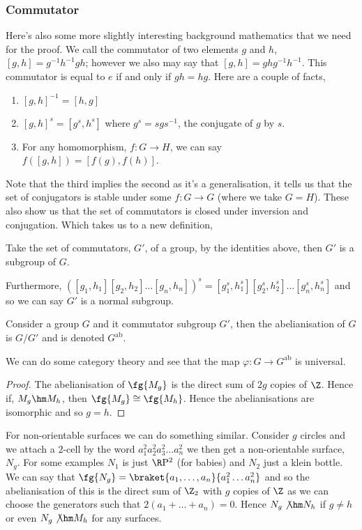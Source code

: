 \subsubsection{Commutator}
Here's also some more slightly interesting background mathematics that we need for the proof. We call the commutator of two elements $g$ and $h$, $[g, h] = g^{-1}h^{-1}gh$; however we also may say that $[g, h] = ghg^{-1}h^{-1}$. This commutator is equal to $e$ if and only if $gh = hg$. Here are a couple of facts,
\begin{enumerate}
  \item $[g, h]^{-1} = [h, g]$
  \item $[g, h]^s = [g^s, h^s]$ where $g^s = sgs^{-1}$, the conjugate of $g$ by $s$.
  \item For any homomorphism, $f : G \to H$, we can say $f([g, h]) = [f(g), f(h)]$.
\end{enumerate}
Note that the third implies the second as it's a generalisation, it tells us that the set of conjugators is stable under some $f : G \to G$ (where we take $G = H$). These also show us that the set of commutators is closed under inversion and conjugation. Which takes us to a new definition,
\begin{ndefi}
  Take the set of commutators, $G'$, of a group, by the identities above, then $G'$ is a subgroup of $G$.
\end{ndefi}

\noindent
Furthermore, $([g_1, h_1][g_2, h_2]\dots [g_n, h_n])^s = [g_1^s, h_1^s][g_2^s, h_2^s] \dots [g_n^s, h_n^s]$ and so we can say $G'$ is a normal subgroup.

\begin{ndefi}[Abelianisation]
  Consider a group $G$ and it commutator subgroup $G'$, then the abelianisation of $G$ is $G / G'$ and is denoted $G^{\text{ab}}$.
\end{ndefi}

\noindent
We can do some category theory and see that the map $\varphi : G \to G^{\text{ab}}$ is universal.

\begin{proof}
  The abelianisation of $\fg {M_g}$ is the direct sum of $2g$ copies of $\Z$. Hence if, $M_g \hm M_h$, then $\fg {M_g} \cong \fg {M_h}$. Hence the abelianisations are isomorphic and so $g = h$.
\end{proof}

For non-orientable surfaces we can do something similar. Consider $g$ circles and we attach a $2$-cell by the word $a_1^2a_2^2a_3^2\dots a_n^2$ we then get a non-orientable surface, $N_g$. For some examples $N_1$ is just $\R \mathrm{P}^2$ (for babies) and $N_2$ just a klein bottle. We can say that $\fg {N_g} = \braket{a_1, \dots, a_n}{a_1^2\dots a_n^2}$ and so the abelianisation of this is the direct sum of $\Z_2$ with $g$ copies of $\Z$ as we can choose the generators such that $2(a_1 + \dots + a_n) = 0$.
Hence $N_g \not\hm N_h$ if $g \ne h$ or even $N_g \not\hm M_h$ for any surfaces. \\

